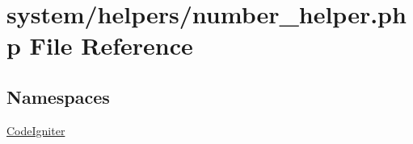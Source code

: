 \hypertarget{number__helper_8php}{}\section{system/helpers/number\+\_\+helper.php File Reference}
\label{number__helper_8php}
\subsection*{Namespaces}
\begin{DoxyCompactItemize}
\item 
 \mbox{\hyperlink{namespace_code_igniter}{Code\+Igniter}}
\end{DoxyCompactItemize}
